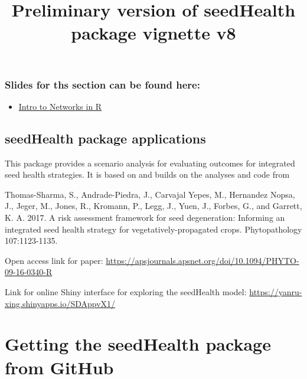 \documentclass[]{article}
\title{Preliminary version of seedHealth package vignette v8}
\author{}
\date{}
\providecommand{\tightlist}{%
  \setlength{\itemsep}{0pt}\setlength{\parskip}{0pt}}
\begin{document}
\maketitle

\subsubsection{Slides for ths section can be found
here:}\label{slides-for-ths-section-can-be-found-here}

\begin{itemize}
\tightlist
\item
  \href{PDFFiles/R\%20packages\%20seedHealth\%20and\%20INAprelim.pdf}{Intro
  to Networks in R}
\end{itemize}

\subsection{seedHealth package
applications}\label{seedhealth-package-applications}

This package provides a scenario analysis for evaluating outcomes for
integrated seed health strategies. It is based on and builds on the
analyses and code from

Thomas-Sharma, S., Andrade-Piedra, J., Carvajal Yepes, M., Hernandez
Nopsa, J., Jeger, M., Jones, R., Kromann, P., Legg, J., Yuen, J.,
Forbes, G., and Garrett, K. A. 2017. A risk assessment framework for
seed degeneration: Informing an integrated seed health strategy for
vegetatively-propagated crops. Phytopathology 107:1123-1135.

Open access link for paper:
\url{https://apsjournals.apsnet.org/doi/10.1094/PHYTO-09-16-0340-R}

Link for online Shiny interface for exploring the seedHealth model:
\url{https://yanru-xing.shinyapps.io/SDAppvX1/}

\section{Getting the seedHealth package from
GitHub}\label{getting-the-seedhealth-package-from-github}
\end{document}
